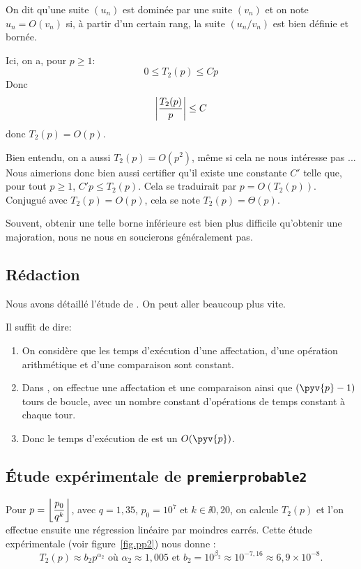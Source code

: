 \begin{defi}
  On dit qu'une suite $(u_{n})$ est dominée par une suite $(v_{n})$ et
  on note $u_{n} = O(v_{n})$ si,  à partir d'un certain rang, la suite
  $(u_{n}/v_{n})$ est bien définie et bornée.  
\end{defi}

Ici, on a, pour $p\geq 1$:
\begin{equation*}
  0 \leq T_{2}(p) \leq C p
\end{equation*}
Donc
\begin{equation*}
  \left|\frac{T_{2}(p)}{p}\right| \leq C
\end{equation*}
donc $T_{2}(p)=O(p)$.

\begin{rem}
  Bien entendu, on a aussi $T_2(p) = O(p^2)$, même si cela ne nous intéresse pas ... Nous aimerions donc bien aussi certifier qu'il existe une constante $C'$ telle que, pour tout $p\geq 1$, $C'p \leq T_2(p)$. 
  Cela se traduirait par $p = O(T_2(p))$. Conjugué avec $T_2(p) = O(p)$, cela se note $T_2(p) =\Theta(p)$. 
  
  Souvent, obtenir une telle borne inférieure est bien plus difficile qu'obtenir une majoration, nous ne nous en soucierons généralement pas. 
\end{rem}


\subsection{Rédaction}
Nous avons détaillé l'étude de . On peut aller
beaucoup plus vite.

Il suffit de dire:

\begin{enumerate}
\item On considère que les temps d'exécution d'une affectation, d'une
  opération arithmétique et d'une comparaison sont constant.
\item Dans , on effectue une affectation et
  une comparaison ainsi que $(\pyv{p}-1)$ tours de boucle, avec un
  nombre constant d'opérations de temps constant à chaque tour.
\item Donc le temps d'exécution de  est un
  $O(\pyv{p})$.
\end{enumerate}

\subsection{Étude expérimentale de \texttt{premierprobable2}}
  Pour $p = \left\lfloor\dfrac{p_0}{q^k}\right\rfloor$, avec $q = 1,35$, $p_0 = 10^7$ et $k\in\ii{0,20}$, on calcule $T_2(p)$ et l'on effectue ensuite une régression linéaire par moindres carrés. Cette étude expérimentale (voir figure~\ref{fig.pp2}) nous donne :
\begin{equation*}
  T_{2}(p)\approx b_{2} p^{\alpha_{2}}
  \text{ où }\alpha_{2}\approx 1,005
  \text{ et }b_{2} = 10^{\beta_{2}} \approx 10^{-7,16}\approx 6,9\times 10^{-8}.
\end{equation*}

